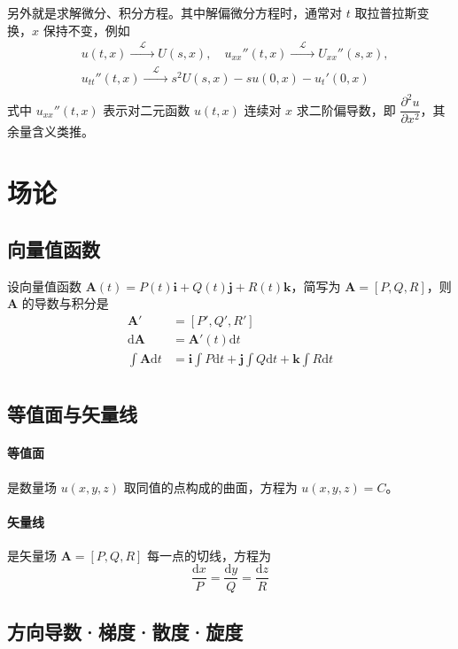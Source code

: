 \documentclass[UTF8]{ctexart}
\renewcommand\d{\mathrm{d}}
\newcommand\lbh{\xrightarrow{\quad \mathcal{L} \quad}} %
\newcommand\A{\boldsymbol{A}}
\newcommand\ii{\boldsymbol{i}}
\newcommand\jj{\boldsymbol{j}}
\newcommand\kk{\boldsymbol{k}}
\begin{document}
另外就是求解微分、积分方程。其中解偏微分方程时，通常对 $t$ 取拉普拉斯变换，$x$ 保持不变，例如
\begin{equation*}
\begin{aligned}
    &u(t,x)\lbh U(s,x),\quad u_{xx}'' (t,x)\lbh U_{xx}'' (s,x), \\
    &u_{tt}''(t,x) \lbh s^2 U(s,x) - s u(0,x) - u_t' (0,x)\\
\end{aligned}
\end{equation*}
式中 $u_{xx}''(t,x)$ 表示对二元函数 $u(t,x)$ 连续对 $x$ 求二阶偏导数，即 $\dfrac{\partial ^2 u}{\partial x^2}$，其余量含义类推。

\section{场论}
\subsection{向量值函数} 设向量值函数 $\A(t) = P(t)\ii + Q(t)\jj + R(t)\kk$，简写为 $\A=[P,Q,R]$，则 $\A$ 的导数与积分是
\begin{equation*}
\begin{aligned}
    \A' &= [P', Q', R'] \\
    \d\A &= \A'(t) \d t \\
    \int \A\d t &= \ii\int P\d t + \jj\int Q\d t + \kk\int R\d t \\
\end{aligned}
\end{equation*}

\subsection{等值面与矢量线}
\paragraph{等值面} 是数量场 $u(x,y,z)$ 取同值的点构成的曲面，方程为 $u(x,y,z)=C$。

\paragraph{矢量线} 是矢量场 $\A=[P,Q,R]$ 每一点的切线，方程为
\begin{equation*}
    \dfrac{\d x}{P} = \dfrac{\d y}{Q} = \dfrac{\d z}{R}
\end{equation*}

\subsection{方向导数·梯度·散度·旋度}
\end{document}
